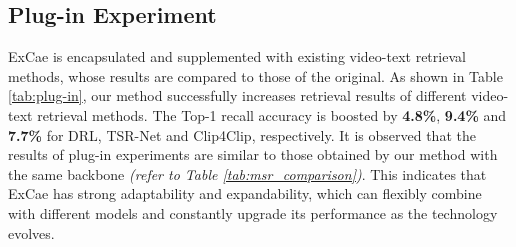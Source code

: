 \subsection{Plug-in Experiment} 
ExCae is encapsulated and supplemented with existing video-text retrieval methods, whose results are compared to those of the original. As shown in Table \ref{tab:plug-in}, our method successfully increases retrieval results of different video-text retrieval methods. The Top-1 recall accuracy is boosted by \textbf{4.8\%}, \textbf{9.4\%} and \textbf{7.7\%} for DRL, TSR-Net and Clip4Clip, respectively. It is observed that the results of plug-in experiments are similar to those obtained by our method with the same backbone \textit{(refer to Table \ref{tab:msr_comparison})}. This indicates that ExCae has strong adaptability and expandability, which can flexibly combine with different models and constantly upgrade its performance as the technology evolves.
